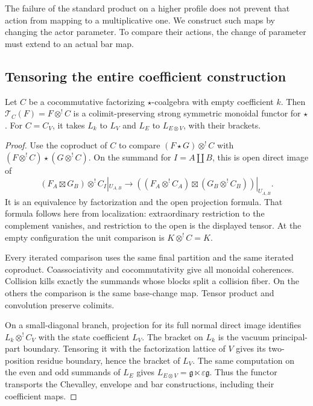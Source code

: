 The failure of the standard product on a higher
profile does not prevent that action from mapping
to a multiplicative one. We construct such maps
by changing the actor parameter. To compare their
actions, the change of parameter must extend to
an actual bar map.

\subsection{Tensoring the entire coefficient construction}

\begin{lemma}\label{cbc:va:strong-tensor}
Let $C$ be a cocommutative factorizing
$\star$-coalgebra with empty coefficient $k$.
Then $\mathcal T_C(F)=F\otimes^!C$ is a
colimit-preserving strong symmetric monoidal
functor for $\star$.
For $C=C_V$, it takes $L_k$ to $L_V$ and
$L_E$ to $L_{E\otimes V}$, with their brackets.
\end{lemma}
\begin{proof}
Use the coproduct of $C$ to compare
$(F\star G)\otimes^!C$ with
$(F\otimes^!C)\star(G\otimes^!C)$.
On the summand for $I=A\amalg B$, this is
open direct image of
\[
 (F_A\boxtimes G_B)\otimes^!C_I|_{U_{A,B}}
 \longrightarrow
 ((F_A\otimes^!C_A)\boxtimes
                  (G_B\otimes^!C_B))|_{U_{A,B}}.
\]
It is an equivalence by factorization and the
open projection formula. That formula follows
here from localization: extraordinary restriction
to the complement vanishes, and restriction to
the open is the displayed tensor.
At the empty configuration the unit comparison
is $K\otimes^!C=K$.

Every iterated comparison uses the same final
partition and the same iterated coproduct.
Coassociativity and cocommutativity give all
monoidal coherences. Collision kills exactly
the summands whose blocks split a collision
fiber. On the others the comparison is the
same base-change map. Tensor product and
convolution preserve colimits.

On a small-diagonal branch, projection for its
full normal direct image identifies
$L_k\otimes^!C_V$ with the state coefficient
$L_V$. The bracket on $L_k$ is the vacuum
principal-part boundary. Tensoring it with
the factorization lattice of $V$ gives its
two-position residue boundary, hence the
bracket of $L_V$.
The same computation on the even and odd
summands of $L_E$ gives
$L_{E\otimes V}=\mathfrak g\ltimes\varepsilon\mathfrak g$.
Thus the functor transports the Chevalley,
envelope and bar constructions, including
their coefficient maps.
\end{proof}

